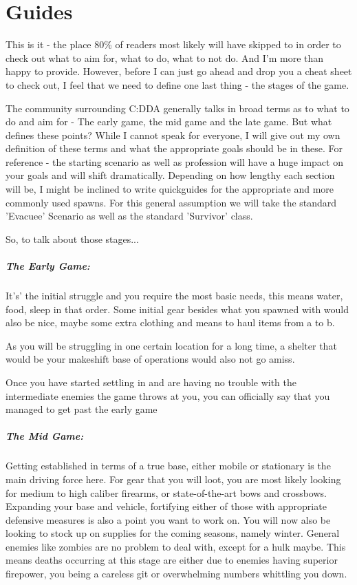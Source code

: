 \chapter{Guides}

This is it - the place 80\% of readers most likely will have skipped to in order to check out what to aim for, what to do, what to not do. And I'm more than happy to provide. However, before I can just go ahead and drop you a cheat sheet to check out, I feel that we need to define one last thing - the stages of the game.

The community surrounding C:DDA generally talks in broad terms as to what to do and aim for - The early game, the mid game and the late game. But what defines these points? While I cannot speak for everyone, I will give out my own definition of these terms and what the appropriate goals should be in these. For reference - the starting scenario as well as profession will have a huge impact on your goals and will shift dramatically. Depending on how lengthy each section will be, I might be inclined to write quickguides for the appropriate and more commonly used spawns. For this general assumption we will take the standard 'Evacuee' Scenario as well as the standard 'Survivor' class.

So, to talk about those stages...

\paragraph{The Early Game:}
It's' the initial struggle and you require the most basic needs, this means water, food, sleep in that order. Some initial gear besides what you spawned with would also be nice, maybe some extra clothing and means to haul items from a to b.

As you will be struggling in one certain location for a long time, a shelter that would be your makeshift base of operations would also not go amiss.

Once you have started settling in and are having no trouble with the intermediate enemies the game throws at you, you can officially say that you managed to get past the early game

\paragraph{The Mid Game:}
Getting established in terms of a true base, either mobile or stationary is the main driving force here. For gear that you will loot, you are most likely looking for medium to high caliber firearms, or state-of-the-art bows and crossbows. Expanding your base and vehicle, fortifying either of those with appropriate defensive measures is also a point you want to work on. You will now also be looking to stock up on supplies for the coming seasons, namely winter. General enemies like zombies are no problem to deal with, except for a hulk maybe. This means deaths occurring at this stage are either due to enemies having superior firepower, you being a careless git or overwhelming numbers whittling you down.

